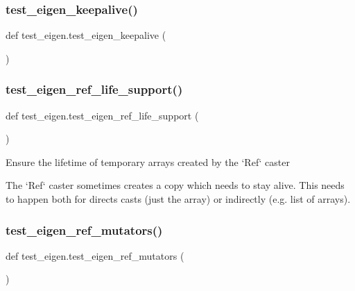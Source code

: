 \mbox{\label{namespacetest__eigen_a495316a5384cfbd729b406311eedd73f}} 
\subsubsection{\texorpdfstring{test\_eigen\_keepalive()}{test\_eigen\_keepalive()}}
{\footnotesize\ttfamily def test\+\_\+eigen.\+test\+\_\+eigen\+\_\+keepalive (\begin{DoxyParamCaption}{ }\end{DoxyParamCaption})}

\mbox{\label{namespacetest__eigen_afc36cc526e4ac07cb0d8d874b189bbb0}} 
\subsubsection{\texorpdfstring{test\_eigen\_ref\_life\_support()}{test\_eigen\_ref\_life\_support()}}
{\footnotesize\ttfamily def test\+\_\+eigen.\+test\+\_\+eigen\+\_\+ref\+\_\+life\+\_\+support (\begin{DoxyParamCaption}{ }\end{DoxyParamCaption})}

\begin{DoxyVerb}Ensure the lifetime of temporary arrays created by the `Ref` caster

The `Ref` caster sometimes creates a copy which needs to stay alive. This needs to
happen both for directs casts (just the array) or indirectly (e.g. list of arrays).
\end{DoxyVerb}
 \mbox{\label{namespacetest__eigen_a6eb57ebc470780c092ef584ff89802a9}} 
\subsubsection{\texorpdfstring{test\_eigen\_ref\_mutators()}{test\_eigen\_ref\_mutators()}}
{\footnotesize\ttfamily def test\+\_\+eigen.\+test\+\_\+eigen\+\_\+ref\+\_\+mutators (\begin{DoxyParamCaption}{ }\end{DoxyParamCaption})}

